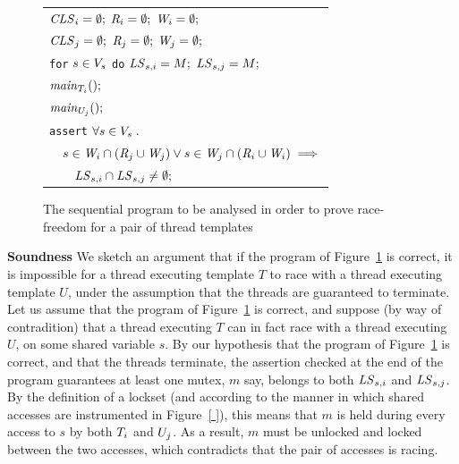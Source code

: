 \begin{figure}
\begin{tabular}{l}

$\mathit{CLS}_{i} = \emptyset;$ $\mathit{R}_{i} = \emptyset;$ $\mathit{W}_{i} = \emptyset;$ \\
$\mathit{CLS}_{j} = \emptyset;$ $\mathit{R}_{j} = \emptyset;$ $\mathit{W}_{j} = \emptyset;$ \\
\texttt{for} $s \in V_s$ \texttt{do} $\mathit{LS}_{s,i} = M;$ $\mathit{LS}_{s,j} = M;$ \medskip
\\

$\mathit{main}_{T_{i}}();$ \\
$\mathit{main}_{U_{j}}();$ \medskip\\

\texttt{assert} $\forall s \in V_s \; .$ \\

$\quad s \in \mathit{W}_{i} \cap (\mathit{R}_{j} \cup \mathit{W}_{j}) \vee s \in \mathit{W}_{j} \cap (\mathit{R}_{i} \cup \mathit{W}_{i}) \implies$ \\

$\quad\quad \mathit{LS}_{s,i} \cap \mathit{LS}_{s,j} \neq \emptyset;$ \\

\end{tabular}
\caption{The sequential program to be analysed in order to prove race-freedom for a pair of thread templates}
\label{fig:sequentialization}
\end{figure}


\medskip\noindent\textbf{Soundness }
We sketch an argument that if the program of Figure~\ref{fig:sequentialization} is correct,
it is impossible for a thread executing template $T$ to race with a thread executing template $U$,
under the assumption that the threads are guaranteed to terminate.
Let us assume that the program of Figure~\ref{fig:sequentialization} is correct,
and suppose (by way of contradition) that a thread executing $T$ can in fact race with a thread
executing $U$, on some shared variable $s$.  By our hypothesis that the program
of Figure~\ref{fig:sequentialization} is correct, and that the threads terminate,
the assertion checked at the end of the program guarantees at least one mutex, $m$ say,
belongs to both $\mathit{LS}_{s,i}$ and $\mathit{LS}_{s,j}$.  By the definition of a lockset
(and according to the manner in which shared accesses are instrumented in Figure~\ref{ }),
this means that $m$ is held during every access to $s$ by both $T_{i}$ and $U_{j}$.
As a result, $m$ must be unlocked and locked between the two accesses, which
contradicts that the pair of accesses is racing.


